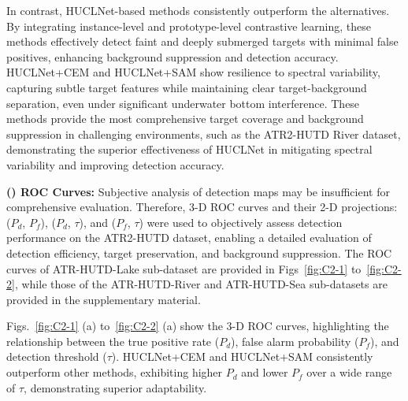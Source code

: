 In contrast, HUCLNet-based methods consistently outperform the alternatives. By integrating instance-level and prototype-level contrastive learning, these methods effectively detect faint and deeply submerged targets with minimal false positives, enhancing background suppression and detection accuracy. HUCLNet+CEM and HUCLNet+SAM show resilience to spectral variability, capturing subtle target features while maintaining clear target-background separation, even under significant underwater bottom interference. These methods provide the most comprehensive target coverage and background suppression in challenging environments, such as the ATR2-HUTD River dataset, demonstrating the superior effectiveness of HUCLNet in mitigating spectral variability and improving detection accuracy.
\par 
\textbf{() ROC Curves:} Subjective analysis of detection maps may be insufficient for comprehensive evaluation. Therefore, 3-D ROC curves and their 2-D projections: ($P_d$, $P_f$), ($P_d$, $\tau$), and ($P_f$, $\tau$) were used to objectively assess detection performance on the ATR2-HUTD dataset, enabling a detailed evaluation of detection efficiency, target preservation, and background suppression. 
The ROC curves of ATR-HUTD-Lake sub-dataset are provided in Figs~\ref{fig:C2-1} to~\ref{fig:C2-2}, while those of the ATR-HUTD-River and ATR-HUTD-Sea sub-datasets are provided in the supplementary material.
\par
Figs.~\ref{fig:C2-1} (a) to~\ref{fig:C2-2} (a) show the 3-D ROC curves, highlighting the relationship between the true positive rate ($P_d$), false alarm probability ($P_f$), and detection threshold ($\tau$). HUCLNet+CEM and HUCLNet+SAM consistently outperform other methods, exhibiting higher $P_d$ and lower $P_f$ over a wide range of $\tau$, demonstrating superior adaptability.
\par
